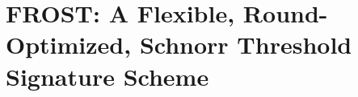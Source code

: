 \chapter{FROST: A Flexible, Round-Optimized, Schnorr Threshold Signature Scheme}
\label{chp:frost}






